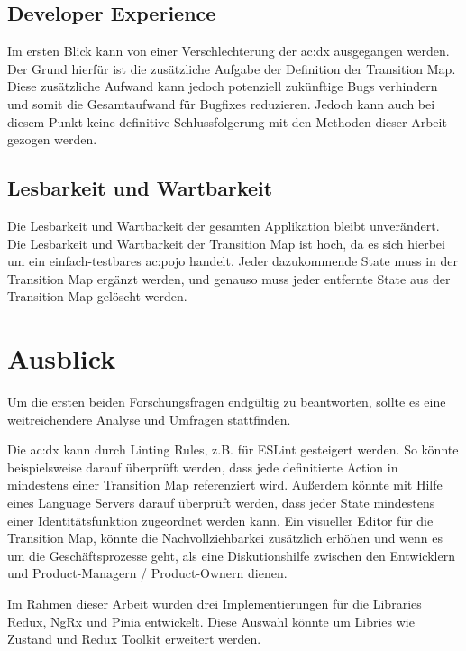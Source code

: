 \subsection{Developer Experience}

Im ersten Blick kann von einer Verschlechterung der \acrshort{ac:dx} ausgegangen werden. Der Grund hierfür ist die zusätzliche Aufgabe der Definition der Transition Map. Diese zusätzliche Aufwand kann jedoch potenziell zukünftige Bugs verhindern und somit die Gesamtaufwand für Bugfixes reduzieren. Jedoch kann auch bei diesem Punkt keine definitive Schlussfolgerung mit den Methoden dieser Arbeit gezogen werden.

\subsection{Lesbarkeit und Wartbarkeit}

Die Lesbarkeit und Wartbarkeit der gesamten Applikation bleibt unverändert. Die Lesbarkeit und Wartbarkeit der Transition Map ist hoch, da es sich hierbei um ein einfach-testbares \acrshort{ac:pojo} handelt. Jeder dazukommende State muss in der Transition Map ergänzt werden, und genauso muss jeder entfernte State aus der Transition Map gelöscht werden.

\section{Ausblick}

Um die ersten beiden Forschungsfragen endgültig zu beantworten, sollte es eine weitreichendere Analyse und Umfragen stattfinden.

Die \acrshort{ac:dx} kann durch Linting Rules, z.B. für ESLint gesteigert werden. So könnte beispielsweise darauf überprüft werden, dass jede definitierte Action in mindestens einer Transition Map referenziert wird. Außerdem könnte mit Hilfe eines Language Servers darauf überprüft werden, dass jeder State mindestens einer Identitätsfunktion zugeordnet werden kann. Ein visueller Editor für die Transition Map, könnte die Nachvollziehbarkei zusätzlich erhöhen und wenn es um die Geschäftsprozesse geht, als eine Diskutionshilfe zwischen den Entwicklern und Product-Managern / Product-Ownern dienen.

Im Rahmen dieser Arbeit wurden drei Implementierungen für die Libraries Redux, NgRx und Pinia entwickelt. Diese Auswahl könnte um Libries wie Zustand und Redux Toolkit erweitert werden.


